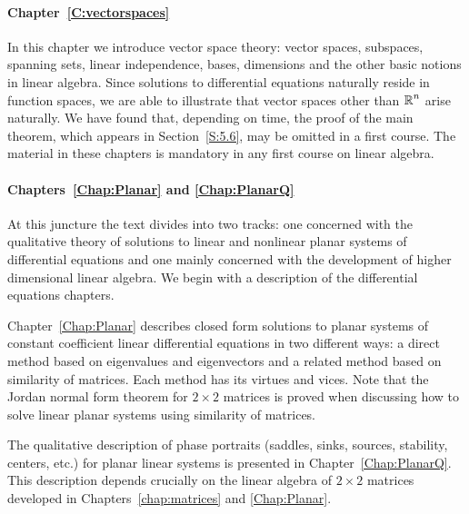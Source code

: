\documentclass{ximera}
\begin{document}
\paragraph{Chapter~\ref{C:vectorspaces}} In this chapter we introduce vector 
space theory: vector spaces, subspaces, spanning sets, linear independence, 
bases, dimensions and the other basic notions in linear algebra.  Since 
solutions to differential equations naturally reside in function spaces, we 
are able to illustrate that vector spaces other than $\mbox{$\Bbb{R}$}^n$ arise naturally.  
We have found that, depending on time, the proof of the main theorem, which 
appears in Section~\ref{S:5.6}, may be omitted in a first course.  The 
material in these chapters is mandatory in any first course on linear algebra.

\paragraph{Chapters~\ref{Chap:Planar} and \ref{Chap:PlanarQ}}%

At this juncture the text divides into two tracks: one concerned with
the qualitative theory of solutions to linear and nonlinear planar
systems of differential equations and one mainly concerned with the
development of higher dimensional linear algebra.  We begin with a
description of the differential equations chapters.

Chapter~\ref{Chap:Planar} describes closed form solutions to planar
systems of constant coefficient linear differential equations in two
different ways: a direct method based on eigenvalues and eigenvectors
 and a related method based on
similarity of matrices.  Each method has its virtues and
vices.  Note that the Jordan normal form theorem for $2\times 2$
matrices is proved when discussing how to solve linear planar systems
using similarity of matrices.

The qualitative description of phase portraits (saddles, sinks,
sources, stability, centers, etc.) for planar linear systems is
presented in Chapter~\ref{Chap:PlanarQ}.  This description depends
crucially on the linear algebra of $2\times 2$ matrices developed in
Chapters~\ref{chap:matrices} and \ref{Chap:Planar}.

\end{document}

